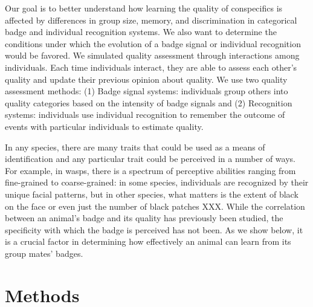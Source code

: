 Our goal is to better understand how learning the quality of conspecifics is affected by differences in group size, memory, and discrimination in categorical badge and individual recognition systems. We also want to determine the conditions under which the evolution of a badge signal or individual recognition would be favored. We simulated quality assessment through interactions among individuals. Each time individuals interact, they are able to assess each other's quality and update their previous opinion about quality. We use two quality assessment methods: (1) Badge signal systems: individuals group others into quality categories based on the intensity of badge signals and (2) Recognition systems: individuals use individual recognition to remember the outcome of events with particular individuals to estimate quality. 

In any species, there are many traits that could be used as a means of identification and any particular trait could be perceived in a number of ways. For example, in wasps, there is a spectrum of perceptive abilities ranging from fine-grained to coarse-grained: in some species, individuals are recognized by their unique facial patterns, but in other species, what matters is the extent of black on the face or even just the number of black patches \cite{Tibbetts:2004kx}XXX. While the correlation between an animal's badge and its quality has previously been studied, the specificity with which the badge is perceived has not been. As we show below, it is a crucial factor in determining how effectively an animal can learn from its group mates' badges.

\section*{Methods} 
%
